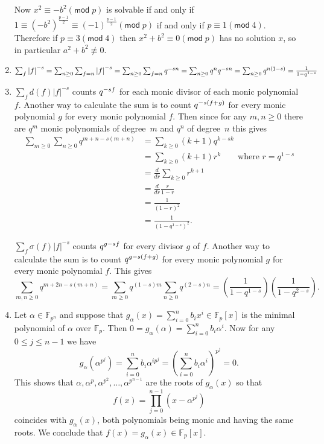 \documentclass[12pt]{article}
\renewcommand{\pmod}[1]{\left(\mathsf{mod}\;#1\right)}
\let\deg\relax\DeclareMathOperator{\deg}{\mathsf{deg}}
\begin{document}
\begin{enumerate}
Now $x^2\equiv -b^2\pmod{p}$ is solvable
if and only if $1\equiv\left(-b^2\right)^{\frac{p-1}{2}}
\equiv\left(-1\right)^{\frac{p-1}{2}}\pmod{p}$
if and only if $p\equiv 1\pmod{4}$.
Therefore if $p\equiv 3\pmod{4}$ then $x^2+b^2\equiv 0\pmod{p}$
has no solution $x$, so in particular $a^2+b^2\not\equiv 0$.

\item %
$\sum_f\left|f\right|^{-s}
=\sum_{n\ge 0}\sum_{\deg{f}=n}\left|f\right|^{-s}
=\sum_{n\ge 0}\sum_{\deg{f}=n}q^{-sn}
=\sum_{n\ge 0}q^{n}q^{-sn}
=\sum_{n\ge 0}q^{n\left(1-s\right)}
=\frac{1}{1-q^{1-s}}$

\item %
$\sum_fd\left(f\right)\left|f\right|^{-s}$
counts $q^{-s\deg{f}}$ for each monic divisor of each monic polynomial $f$.
Another way to calculate the sum is to count
$q^{-s\left(\deg{f}+\deg{g}\right)}$ for every monic polynomial $g$
for every monic polynomial $f$. Then since for any $m,n\ge 0$
there are $q^m$ monic polynomials of degree~$m$
and $q^n$ of degree~$n$ this gives
\begin{align*}
\sum_{m\ge 0}\sum_{n\ge 0}q^{m+n-s\left(m+n\right)}
&=\sum_{k\ge 0}\left(k+1\right)q^{k-sk}\\
&=\sum_{k\ge 0}\left(k+1\right)r^k\qquad\text{where $r=q^{1-s}$}\\
&=\frac{d}{dr}\sum_{k\ge 0}r^{k+1}\\
&=\frac{d}{dr}\frac{r}{1-r}\\
&=\frac{1}{\left(1-r\right)^2}\\
&=\frac{1}{\left(1-q^{1-s}\right)^2}.
\end{align*}

$\sum_f\sigma\left(f\right)\left|f\right|^{-s}$
counts $q^{\deg{g}-s\deg{f}}$ for every divisor $g$ of $f$.
Another way to calculate the sum is to count
$q^{\deg{g}-s\left(\deg{f}+\deg{g}\right)}$
for every monic polynomial $g$ for every monic polynomial $f$. This gives
\[\sum_{m,n\ge 0}q^{m+2n-s\left(m+n\right)}
=\sum_{m\ge 0}q^{\left(1-s\right)m}
\sum_{n\ge 0}q^{\left(2-s\right)n}
=\left(\frac{1}{1-q^{1-s}}\right)
\left(\frac{1}{1-q^{2-s}}\right).\]



\item %
Let $\alpha\in\mathbb{F}_{p^n}$
and suppose that $g_\alpha\left(x\right)
=\sum_{i=0}^nb_ix^i\in\mathbb{F}_p\left[x\right]$
is the minimal polynomial of $\alpha$ over $\mathbb{F}_p$.
Then $0=g_\alpha\left(\alpha\right)=\sum_{i=0}^nb_i\alpha^i$.
Now for any $0\le j\le n-1$ we have
\[g_\alpha\left(\alpha^{p^j}\right)
=\sum_{i=0}^nb_i\alpha^{ip^j}
=\left(\sum_{i=0}^nb_i\alpha^i\right)^{p^j}=0.\]
This shows that $\alpha,\alpha^p,\alpha^{p^2},\ldots,\alpha^{p^{n-1}}$
are the roots of $g_\alpha\left(x\right)$ so that
\[f\left(x\right)=\prod_{j=0}^{n-1}\left(x-\alpha^{p^j}\right)\]
coincides with $g_\alpha\left(x\right)$, both
polynomials being monic and having the same roots.
We conclude that
$f\left(x\right)=g_\alpha\left(x\right)
\in\mathbb{F}_p\left[x\right]$.


\end{enumerate}
\end{document}
